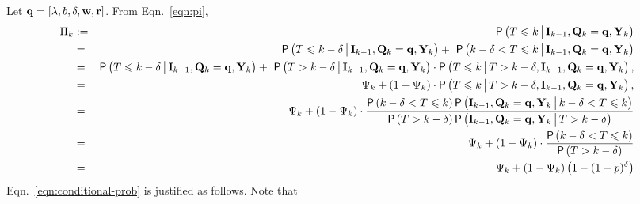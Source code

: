\documentclass[acmtosn]{acmtrans2m}
\newcommand{\prob}[1]{\mathsf{P}\left(#1\right)}
\begin{document}
\vspace{2mm}

Let ${\bf q} = [\lambda, b, \delta, {\bf w},{\bf r}]$.
From Eqn.~\ref{eqn:pi},
{\footnotesize
\begin{eqnarray}
\Pi_k 
& := & \prob{ T \leqslant k \big\arrowvert {\bf I}_{k-1}, {\bf Q}_k =
{\bf q}, {\bf Y}_k  }\nonumber\\ 
&  = & \prob{ T \leqslant k-\delta   \big\arrowvert {\bf I}_{k-1}, {\bf
Q}_k = {\bf q},{\bf Y}_k  }  + \  
       \prob{ k-\delta < T \leqslant k \big\arrowvert {\bf I}_{k-1}, {\bf
	   Q}_k = {\bf q}, {\bf Y}_k } \nonumber\\ 
&  = & \prob{ T \leqslant k-\delta   \big\arrowvert {\bf I}_{k-1}, {\bf
Q}_k = {\bf q}, {\bf Y}_k }  + \  
       \prob{ T > k-\delta \big\arrowvert {\bf I}_{k-1}, {\bf Q}_k =
	   {\bf q}, {\bf Y}_k } \cdot 
       \prob{ T \leqslant k \big\arrowvert T > k-\delta,{\bf I}_{k-1},
	   {\bf Q}_k = {\bf q}, {\bf Y}_k },\nonumber\\ 
& = &  \Psi_k + (1-\Psi_k)\cdot\prob{ T \leqslant k \big\arrowvert T >
k-\delta,{\bf I}_{k-1}, {\bf Q}_k = {\bf q}, {\bf Y}_k },\nonumber\\ 
& = &\Psi_k  + (1-\Psi_k)\cdot \frac{\prob{ k - \delta < T \leqslant k}
\prob{ {\bf I}_{k-1}, {\bf Q}_k = {\bf q}, {\bf Y}_k  \big\arrowvert
k-\delta < T \leqslant k}} {\prob{ T > k - \delta } \prob{ {\bf
I}_{k-1}, {\bf Q}_k = {\bf q}, {\bf Y}_k  \big\arrowvert T > k-\delta }}\nonumber\\ 
\label{eqn:conditional-prob}
& = &{\Psi_k}  + (1-\Psi_k)\cdot \frac {\prob{ k - \delta < T \leqslant k} } {\prob{ T > k - \delta } }\\ 
\label{eqn:conditional-prob1}
& = & \hspace{-0mm} \Psi_k + (1-\Psi_k)\left(1 - (1-p)^{\delta}\right)
\end{eqnarray}
}
Eqn.~\ref{eqn:conditional-prob} is justified as follows.
Note that 
\end{document}
